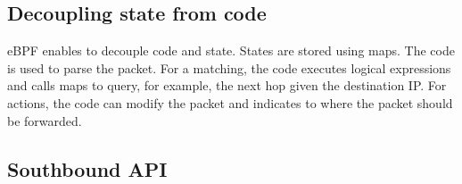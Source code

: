 
\subsection{Decoupling state from code}
\label{sec:selfpopulate}

eBPF enables to decouple code and state.
States are stored using maps.
The code is used to parse the packet.
For a matching, the code executes logical expressions and calls maps to query, for example, the next hop given the destination IP.
For actions, the code can modify the packet and indicates to where the packet should be forwarded.



\subsection{Southbound API}
\label{sec:southboundAPI}

